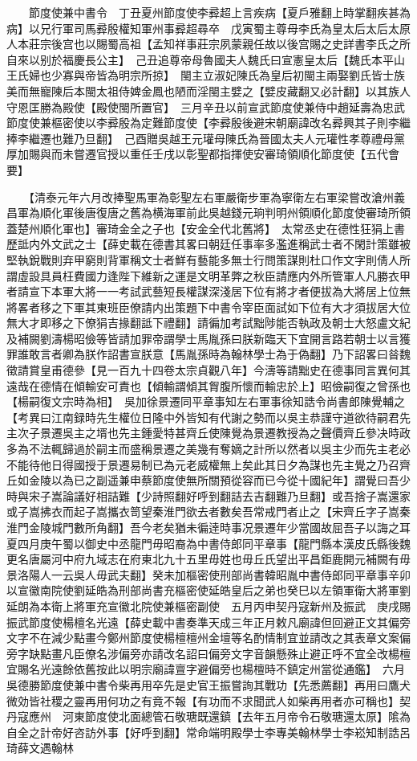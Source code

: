 　　節度使兼中書令　丁丑夏州節度使李彛超上言疾病【夏戶雅翻上時掌翻疾甚為病】以兄行軍司馬彛殷權知軍州事彛超尋卒　戊寅蜀主尊母李氏為皇太后太后太原人本莊宗後宫也以賜蜀高祖【孟知祥事莊宗夙蒙親任故以後宫賜之史詳書李氏之所自來以别於福慶長公主】　己丑追尊帝母魯國夫人魏氏曰宣憲皇太后【魏氏本平山王氏婦也少寡與帝皆為明宗所掠】　閩主立淑妃陳氏為皇后初閩主兩娶劉氏皆士族美而無寵陳后本閩太祖侍婢金鳳也陋而淫閩主嬖之【嬖皮藏翻又必計翻】以其族人守恩匡勝為殿使【殿使閩所置官】　三月辛丑以前宣武節度使兼侍中趙延壽為忠武節度使兼樞密使以李彛殷為定難節度使【李彛殷後避宋朝廟諱改名彛興其子則李繼捧李繼遷也難乃旦翻】　己酉贈吳越王元瓘母陳氏為晉國太夫人元瓘性孝尊禮母黨厚加賜與而未嘗遷官授以重任壬戌以彰聖都指揮使安審琦領順化節度使【五代會要】

　　【清泰元年六月改捧聖馬軍為彰聖左右軍嚴衛步軍為寧衛左右軍梁嘗改滄州義昌軍為順化軍後唐復唐之舊為横海軍前此吳越錢元珦判明州領順化節度使審琦所領蓋楚州順化軍也】審琦金全之子也【安金全代北舊將】　太常丞史在德性狂狷上書歷詆内外文武之士【薛史載在德書其畧曰朝廷任事率多濫進稱武士者不閑計策雖被堅執銳戰則弃甲窮則背軍稱文士者鮮有藝能多無士行問策謀則杜口作文字則倩人所謂虛設具員枉費國力逢陛下維新之運是文明革弊之秋臣請應内外所管軍人凡勝衣甲者請宣下本軍大將一一考試武藝短長權謀深淺居下位有將才者便拔為大將居上位無將畧者移之下軍其東班臣僚請内出策題下中書令宰臣面試如下位有大才須拔居大位無大才即移之下僚狷吉掾翻詆下禮翻】請徧加考試黜陟能否執政及朝士大怒盧文紀及補闕劉濤楊昭儉等皆請加罪帝謂學士馬胤孫曰朕新臨天下宜開言路若朝士以言獲罪誰敢言者卿為朕作詔書宣朕意【馬胤孫時為翰林學士為于偽翻】乃下詔畧曰㫺魏徵請賞皇甫德參【見一百九十四卷太宗貞觀八年】今濤等請黜史在德事同言異何其遠哉在德情在傾輸安可責也【傾輸謂傾其胷腹所懷而輸忠於上】昭儉嗣復之曾孫也【楊嗣復文宗時為相】　吳加徐景遷同平章事知左右軍事徐知誥令尚書郎陳覺輔之　【考異曰江南録時先生權位日隆中外皆知有代謝之勢而以吳主恭謹守道欲待嗣君先主次子景遷吳主之壻也先主鍾愛特甚齊丘使陳覺為景遷教授為之聲價齊丘參决時政多為不法輒歸過於嗣主而盛稱景遷之美幾有奪嫡之計所以然者以吳主少而先主老必不能待他日得國授于景遷易制已為元老威權無上矣此其日夕為謀也先主覺之乃召齊丘如金陵以為已之副遥兼申蔡節度使無所關預從容而已今從十國紀年】謂覺曰吾少時與宋子嵩論議好相詰難【少詩照翻好呼到翻詰去吉翻難乃旦翻】或吾捨子嵩還家或子嵩拂衣而起子嵩攜衣笥望秦淮門欲去者數矣吾常戒門者止之【宋齊丘字子嵩秦淮門金陵城門數所角翻】吾今老矣猶未徧逹時事况景遷年少當國故屈吾子以誨之耳　夏四月庚午蜀以御史中丞龍門毋昭裔為中書侍郎同平章事【龍門縣本漢皮氏縣後魏更名唐屬河中府九域志在府東北九十五里毋姓也毋丘氏望出平昌鉅鹿開元補闕有毋景洛陽人一云吳人毋武夫翻】癸未加樞密使刑部尚書韓昭胤中書侍郎同平章事辛卯以宣徽南院使劉延皓為刑部尚書充樞密使延皓皇后之弟也癸巳以左領軍衛大將軍劉延朗為本衛上將軍充宣徽北院使兼樞密副使　五月丙申契丹寇新州及振武　庚戌賜振武節度使楊檀名光遠【薛史載中書奏準天成三年正月敕凡廟諱但回避正文其偏旁文字不在減少點畫今鄭州節度使楊檀檀州金壇等名酌情制宜並請改之其表章文案偏旁字缺點畫凡臣僚名涉偏旁亦請改名詔曰偏旁文字音韻懸殊止避正呼不宜全改楊檀宜賜名光遠餘依舊按此以明宗廟諱亶字避偏旁也楊檀時不鎮定州當從通鑑】　六月吳德勝節度使兼中書令柴再用卒先是史官王振嘗詢其戰功【先悉薦翻】再用曰鷹犬微効皆社稷之靈再用何功之有竟不報【有功而不求聞武人如柴再用者亦可稱也】契丹寇應州　河東節度使北面總管石敬瑭既還鎮【去年五月帝令石敬瑭還太原】隂為自全之計帝好咨訪外事【好呼到翻】常命端明殿學士李專美翰林學士李崧知制誥呂琦薛文遇翰林